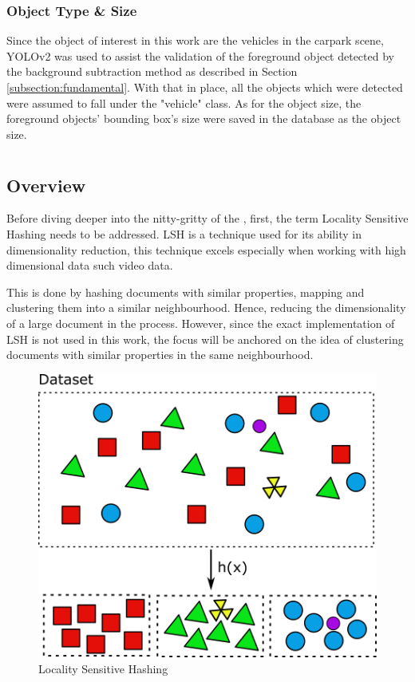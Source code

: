 \subsubsection{Object Type \& Size}
Since the object of interest in this work are the vehicles in the carpark scene, YOLOv2 was used to assist the validation of the foreground object detected by the background subtraction method as described in Section \ref{subsection:fundamental}. With that in place, all the objects which were detected were assumed to fall under the "vehicle" class. As for the object size, the foreground objects' bounding box's size were saved in the database as the object size.





\section{\versionOne }
\label{section:semantic_lsh}

\subsection{Overview}
Before diving deeper into the nitty-gritty of the \versionOne, first, the term Locality Sensitive Hashing needs to be addressed. LSH is a technique used for its ability in dimensionality reduction, this technique excels especially when working with high dimensional data such video data. 

This is done by hashing documents with similar properties, mapping and clustering them into a similar neighbourhood. Hence, reducing the dimensionality of a large document in the process. However, since the exact implementation of LSH is not used in this work, the focus will be anchored on the idea of clustering documents with similar properties in the same neighbourhood. 


\begin{figure}[hbt!]\centering
\includegraphics[width=.7\textwidth]{image/lsh.png}
\caption{Locality Sensitive Hashing}
\label{fig:lshexample}
\end{figure}

